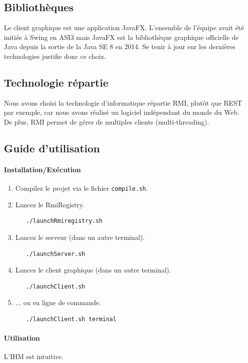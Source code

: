 \documentclass[11pt,dvipsnames,svgnames]{report}
\begin{document}
\subsection{Bibliothèques}
Le client graphique est une application JavaFX. L'ensemble de l'équipe avait été initiée à Swing en ASI3 mais JavaFX est la bibliothèque graphique officielle de Java depuis la sortie de la Java SE 8 en 2014. Se tenir à jour sur les dernières technologies justifie donc ce choix.
\subsection{Technologie répartie}
Nous avons choisi la technologie d'informatique répartie RMI, plutôt que REST par exemple, car nous avons réalisé un logiciel indépendant du monde du Web. De plus, RMI permet de gérer de multiples clients (multi-threading). 
\subsection{Guide d'utilisation}
\paragraph*{Installation/Exécution}
\begin{enumerate}
\item Compilez le projet via le fichier \texttt{compile.sh}.
\item Lancez le RmiRegistry.
\begin{lstlisting}
   ./launchRmiregistry.sh
\end{lstlisting}
\item Lancez le serveur (dans un autre terminal).
\begin{lstlisting}
   ./launchServer.sh
\end{lstlisting}
\item Lancez le client graphique (dans un autre terminal).
\begin{lstlisting}
   ./launchClient.sh 
\end{lstlisting}
\item ... ou en ligne de commande.
\begin{lstlisting}
   ./launchClient.sh terminal
\end{lstlisting}
\end{enumerate}

\paragraph*{Utilisation}
L'IHM est intuitive.
\end{document}

